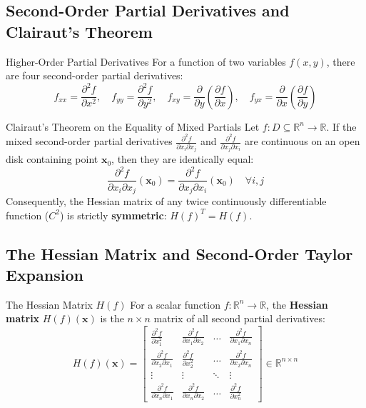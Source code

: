 \subsection{Second-Order Partial Derivatives and Clairaut's Theorem}

\begin{definitionbox}{Higher-Order Partial Derivatives}
For a function of two variables $f(x, y)$, there are four second-order partial derivatives:
\begin{equation}
f_{xx} = \frac{\partial^2 f}{\partial x^2}, \quad f_{yy} = \frac{\partial^2 f}{\partial y^2}, \quad f_{xy} = \frac{\partial}{\partial y}\left(\frac{\partial f}{\partial x}\right), \quad f_{yx} = \frac{\partial}{\partial x}\left(\frac{\partial f}{\partial y}\right)
\end{equation}
\end{definitionbox}

\begin{theorembox}{Clairaut's Theorem on the Equality of Mixed Partials}
Let $f: D \subseteq \mathbb{R}^n \to \mathbb{R}$. If the mixed second-order partial derivatives $\frac{\partial^2 f}{\partial x_i \partial x_j}$ and $\frac{\partial^2 f}{\partial x_j \partial x_i}$ are continuous on an open disk containing point $\mathbf{x}_0$, then they are identically equal:
\begin{equation}
\frac{\partial^2 f}{\partial x_i \partial x_j}(\mathbf{x}_0) = \frac{\partial^2 f}{\partial x_j \partial x_i}(\mathbf{x}_0) \quad \forall i, j
\end{equation}
Consequently, the Hessian matrix of any twice continuously differentiable function ($C^2$) is strictly \textbf{symmetric}: $H(f)^T = H(f)$.
\end{theorembox}

\subsection{The Hessian Matrix and Second-Order Taylor Expansion}

\begin{definitionbox}{The Hessian Matrix $H(f)$}
For a scalar function $f: \mathbb{R}^n \to \mathbb{R}$, the \textbf{Hessian matrix} $H(f)(\mathbf{x})$ is the $n \times n$ matrix of all second partial derivatives:
\begin{equation}
H(f)(\mathbf{x}) = \begin{bmatrix}
\frac{\partial^2 f}{\partial x_1^2} & \frac{\partial^2 f}{\partial x_1 \partial x_2} & \dots & \frac{\partial^2 f}{\partial x_1 \partial x_n} \\
\frac{\partial^2 f}{\partial x_2 \partial x_1} & \frac{\partial^2 f}{\partial x_2^2} & \dots & \frac{\partial^2 f}{\partial x_2 \partial x_n} \\
\vdots & \vdots & \ddots & \vdots \\
\frac{\partial^2 f}{\partial x_n \partial x_1} & \frac{\partial^2 f}{\partial x_n \partial x_2} & \dots & \frac{\partial^2 f}{\partial x_n^2}
\end{bmatrix} \in \mathbb{R}^{n \times n}
\end{equation}
\end{definitionbox}

